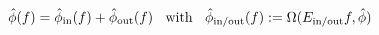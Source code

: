 \begin{equation}\hat{\phi}(f)=\hat{\phi}_{\mbox{\scriptsize in}}(f) + \hat{\phi}_{\mbox{\scriptsize out}}(f)
  \:\:\:\:\mbox{with}\:\:\:\: \hat{\phi}_{\mbox{\scriptsize in/out}}(f):=\Omega(E_{\mbox{\scriptsize in/out}}f,\hat\phi) 
  \label{decm=0}\end{equation} 
